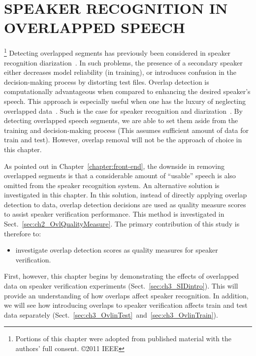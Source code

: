 \chapter{SPEAKER RECOGNITION IN OVERLAPPED SPEECH}\thanks{Portions of this chapter were adopted from published material with the authors' full consent. \copyright 2011 IEEE}
\label{chapter:ovl_in_sid}
Detecting overlapped segments has previously been considered in speaker recognition diarization~\cite{boakye_thesis,yantorno_report}. 
In such problems, the presence of a secondary speaker either decreases model reliability (in training), or introduces confusion in the decision-making process by distorting test files. 
Overlap detection is computationally advantageous when compared to enhancing the desired speaker's speech. 
This approach is especially useful when one has the luxury of neglecting overlapped data~\cite{yantorno_report}. 
Such is the case for speaker recognition and diarization~\cite{Boakye_is_08}. 
By detecting overlapped speech segments, we are able to set them aside from the training and decision-making process (This assumes sufficient amount of data for train and test). 
However, overlap removal will not be the approach of choice in this chapter. 

As pointed out in Chapter~\ref{chapter:front-end}, the downside in removing overlapped segments is that a considerable amount of ``usable'' speech is also omitted from the speaker recognition system. 
An alternative solution is investigated in this chapter. 
In this solution, instead of directly applying overlap detection to data, overlap detection decisions are used as quality measure scores to assist speaker verification performance. 
This method is investigated in Sect.~\ref{sec:ch2_OvlQualityMeasure}. 
The primary contribution of this study is therefore to:
\begin{itemize}
	\item investigate overlap detection scores as quality measures for speaker verification. 
\end{itemize}
First, however, this chapter begins by demonstrating the effects of overlapped data on speaker verification experiments (Sect.~\ref{sec:ch3_SIDintro}). 
This will provide an understanding of how overlaps affect speaker recognition. 
In addition, we will see how introducing overlaps to speaker verification affects train and test data separately (Sect.~\ref{sec:ch3_OvlinTest}~and~\ref{sec:ch3_OvlinTrain}). 


